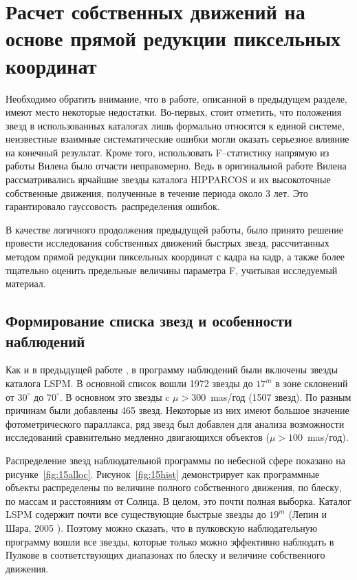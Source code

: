 \section{Расчет собственных движений на основе прямой редукции пиксельных координат} \label{sec:ch3/sect2}
Необходимо обратить внимание, что в работе, описанной в предыдущем разделе, имеют место некоторые недостатки. Во-первых, стоит отметить, что положения звезд в использованных каталогах лишь формально относятся к единой системе, неизвестные взаимные систематические ошибки могли оказать серьезное влияние на конечный результат. Кроме того, использовать F--статистику напрямую из работы Вилена было отчасти неправомерно. Ведь в оригинальной работе Вилена рассматривались ярчайшие звезды каталога HIPPARCOS и их высокоточные собственные движения, полученные в течение периода около 3 лет. Это гарантировало \glqq гауссовость\grqq\  распределения ошибок.

В качестве логичного продолжения предыдущей работы, было принято решение провести исследования собственных движений быстрых звезд, рассчитанных методом прямой редукции пиксельных координат с кадра на кадр, а также более тщательно оценить предельные величины параметра F, учитывая исследуемый материал.
\subsection{Формирование списка звезд и особенности наблюдений} \label{subsec:ch3/sect2/sub1}
Как и в предыдущей работе , в программу наблюдений были включены звезды каталога LSPM. В основной список вошли 1972 звезды до $17^m$ в зоне склонений от $30^{\circ}$ до $70^{\circ}$. В основном это звезды c $\mu>300$~mas/год (1507 звезд). По разным причинам были добавлены 465 звезд. Некоторые из них имеют большое значение фотометрического параллакса, ряд звезд был добавлен для анализа возможности исследований сравнительно медленно двигающихся объектов ($\mu>100$~mas/год).

Распределение звезд наблюдательной программы по небесной сфере показано на рисунке~\ref{fig:15alloc}. Рисунок~\ref{fig:15hist} демонстрирует как программные объекты распределены по величине полного собственного движения, по блеску, по массам и расстояниям от Солнца. В целом, это почти полная выборка. Каталог LSPM содержит почти все существующие быстрые звезды до $19^m$ (Лепин и Шара, 2005 ). Поэтому можно сказать, что в пулковскую наблюдательную программу вошли все звезды, которые только можно эффективно наблюдать в Пулкове в соответствующих диапазонах по блеску и величине собственного движения.

